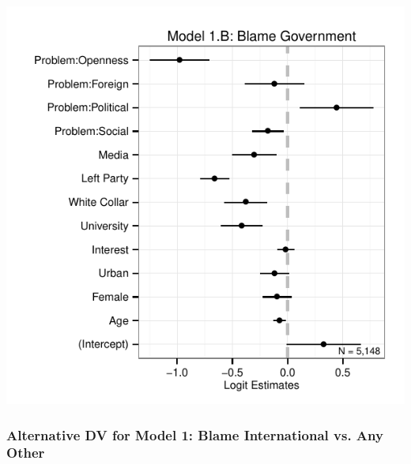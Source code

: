 \documentclass[12pt]{report}
\begin{document}
\begin{center}
\includegraphics{article1_blame_coefs1B.pdf}
\par\end{center}

\begin{center}

\par\end{center}

\pagebreak

\subsubsection*{Alternative DV for Model 1: Blame International vs. Any Other}
\end{document}
